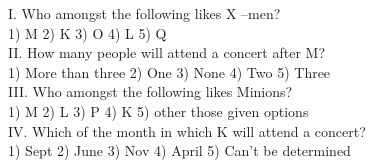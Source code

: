 \documentclass[
]{article}
\begin{document}
I. Who amongst the following likes X –men?\\
1) M \hspace{2mm}2) K \hspace{2mm}3) O \hspace{2mm}4) L \hspace{2mm}5) Q\\

II. How many people will attend a concert after M?\\
1) More than three \hspace{2mm}2) One \hspace{2mm}3) None \hspace{2mm}4) Two \hspace{2mm}5) Three\\

III. Who amongst the following likes Minions?\\
1) M \hspace{2mm}2) L \hspace{2mm}3) P \hspace{2mm}4) K \hspace{2mm}5) other those given options\\

IV. Which of the month in which K will attend a concert?\\
1) Sept \hspace{2mm}2) June \hspace{2mm}3) Nov \hspace{2mm}4) April \hspace{2mm}5) Can’t be determined\\
\end{document}
